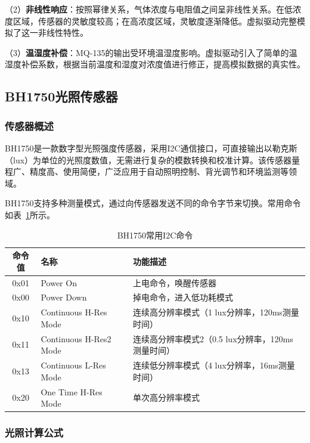 \documentclass[12pt,a4paper]{ctexart}
\begin{document}
（2）\textbf{非线性响应}：按照幂律关系，气体浓度与电阻值之间呈非线性关系。在低浓度区域，传感器的灵敏度较高；在高浓度区域，灵敏度逐渐降低。虚拟驱动完整模拟了这一非线性特性。

（3）\textbf{温湿度补偿}：MQ-135的输出受环境温湿度影响。虚拟驱动引入了简单的温湿度补偿系数，根据当前温度和湿度对浓度值进行修正，提高模拟数据的真实性。

\subsection{BH1750光照传感器}

\subsubsection{传感器概述}

BH1750是一款数字型光照强度传感器，采用I2C通信接口，可直接输出以勒克斯（lux）为单位的光照度数值，无需进行复杂的模数转换和校准计算。该传感器量程广、精度高、使用简便，广泛应用于自动照明控制、背光调节和环境监测等领域。

BH1750支持多种测量模式，通过向传感器发送不同的命令字节来切换。常用命令如表~\ref{tab:bh1750}所示。

\begin{table}[H]
    \centering
    \caption{BH1750常用I2C命令}
    \label{tab:bh1750}
    \begin{tabular}{@{}clp{7cm}@{}}
        \toprule
        \textbf{命令值} & \textbf{名称} & \textbf{功能描述} \\
        \midrule
        0x01 & Power On & 上电命令，唤醒传感器 \\
        0x00 & Power Down & 掉电命令，进入低功耗模式 \\
        0x10 & Continuous H-Res Mode & 连续高分辨率模式（1 lux分辨率，120ms测量时间） \\
        0x11 & Continuous H-Res2 Mode & 连续高分辨率模式2（0.5 lux分辨率，120ms测量时间） \\
        0x13 & Continuous L-Res Mode & 连续低分辨率模式（4 lux分辨率，16ms测量时间） \\
        0x20 & One Time H-Res Mode & 单次高分辨率模式 \\
        \bottomrule
    \end{tabular}
\end{table}

\subsubsection{光照计算公式}
\end{document}
